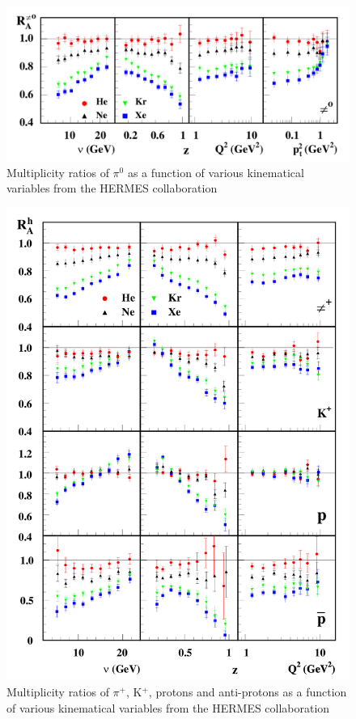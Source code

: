 \begin{figure}[htbp]
\centering
\includegraphics[width=14cm] {fig/Hermes/pi0hermes.png} 
\caption {Multiplicity ratios of $\pi^0$ as a function of various kinematical variables from the HERMES collaboration \cite{Airapetian:2003mi}}
\label{fig:her1}
\end{figure}

\begin{figure}[htbp]
\centering
\includegraphics[width=14cm] {fig/Hermes/hermes1.png} 
\caption {Multiplicity ratios of $\pi^+$, K$^+$, protons and anti-protons as a 
function of various kinematical variables from the HERMES collaboration \cite{Airapetian:2007vu}}
\label{fig:her2}
\end{figure}

